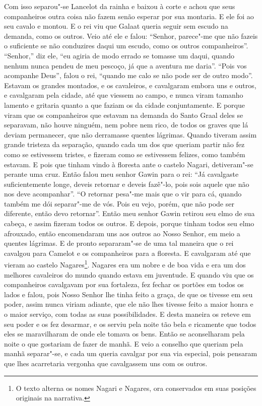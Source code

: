 Com isso separou"-se Lancelot da rainha e baixou à corte e achou que seus
companheiros outra coisa não fazem senão esperar por sua montaria. E ele foi ao
seu cavalo e montou. E o rei viu que Galaat queria seguir sem escudo na
demanda, como os outros. Veio até ele e falou: “Senhor, parece"-me que não
fazeis o suficiente se não conduzires daqui um escudo, como os outros
companheiros”. “Senhor,” diz ele, “eu agiria de modo errado se tomasse um
daqui, quando nenhum nunca pendeu de meu pescoço, já que a aventura me daria”.
“Pois vos acompanhe Deus”, falou o rei, “quando me calo se não pode ser de
outro modo”. Estavam os grandes montados, e os cavaleiros, e cavalgaram
embora uns e outros, e cavalgaram pela cidade, até que viessem ao campo, e
nunca viram tamanho lamento e gritaria quanto a que faziam os da cidade
conjuntamente. E porque viram que os companheiros que estavam na demanda do
Santo Graal deles se separavam, não houve ninguém, nem pobre nem rico, de todos
os graves que lá deviam permanecer, que não derramasse quentes lágrimas. Quando
tiveram assim grande tristeza da separação, quando cada um dos que queriam
partir não fez como se estivessem tristes, e fizeram como se estivessem
felizes, como também estavam. E pois que tinham vindo à floresta ante o castelo
Nagari, detiveram"-se perante uma cruz. Então falou meu senhor Gawin para o rei:
“Já cavalgaste suficientemente longe, deveis retornar e deveis fazê"-lo, pois
sois aquele que não nos deve acompanhar”. “O retornar pesa"-me mais que o vir
para cá, quando também me dói separar"-me de vós. Pois eu vejo, porém, que não
pode ser diferente, então devo retornar”. Então meu senhor Gawin
retirou seu elmo de sua cabeça, e assim fizeram todos os outros. E depois,
porque tinham todos seu elmo afrouxado, então encomendaram uns aos outros ao
Nosso Senhor, em meio a quentes lágrimas. E de pronto separaram"-se de uma tal
maneira que o rei cavalgou para Camelot e os companheiros para a floresta. E
cavalgaram até que vieram ao castelo Nagares\footnote{ O texto
alterna os nomes Nagari e Nagares, ora conservados em suas posições originais
na narrativa.}. Nagares era um nobre e de boa vida e era um dos
melhores cavaleiros do mundo quando estava em juventude. E quando viu que os
companheiros cavalgavam por sua fortaleza, fez fechar os portões em todos os
lados e falou, pois Nosso Senhor lhe tinha feito a graça, de que os tivesse em
seu poder, assim nunca viriam adiante, que ele não lhes tivesse feito a maior
honra e o maior serviço, com todas as suas possibilidades. E desta maneira os
reteve em seu poder e os fez desarmar, e os serviu pela noite tão bela e
ricamente que todos eles se maravilharam de onde ele tomava os bens. Então se
aconselharam pela noite o que gostariam de fazer de manhã. E veio a conselho
que queriam pela manhã separar"-se, e cada um queria cavalgar por sua via
especial, pois pensaram que lhes acarretaria vergonha que cavalgassem uns com
os outros.

